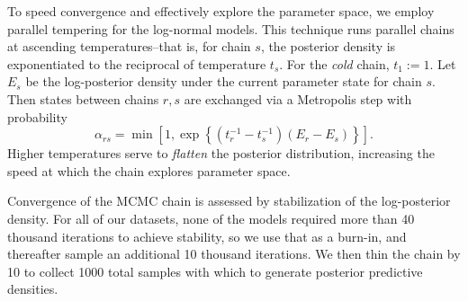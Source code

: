 To speed convergence and effectively explore the parameter space, we employ parallel 
tempering \citep{earl2005} for the log-normal models. This technique runs parallel
chains at ascending temperatures--that is, for chain $s$, the posterior density is 
exponentiated to the reciprocal of temperature $t_s$.  For the \emph{cold} chain, 
$t_1 := 1$.  Let $E_s$ be the log-posterior density under the current parameter 
state for chain $s$.  Then states between chains $r,s$ are exchanged via a Metropolis 
step with probability 
\[
\alpha_{rs} = \min
\left[1, \exp\left\lbrace(t_{r}^{-1} - t_{s}^{-1})(E_r - E_s)\right\rbrace\right].
\]
Higher temperatures serve to \emph{flatten} the posterior distribution, increasing the 
speed at which the chain explores parameter space.

Convergence of the MCMC chain is assessed by stabilization of the log-posterior 
density. For all of our datasets, none of the models required more than 40 thousand 
iterations to achieve stability, so we use that as a burn-in, and thereafter sample 
an additional 10 thousand iterations. We then thin the chain by 10 to collect 1000 
total samples with which to generate posterior predictive densities.

